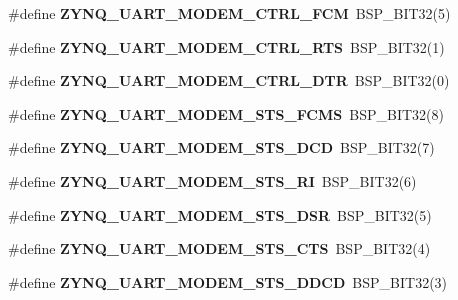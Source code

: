 \begin{DoxyCompactItemize}
\#define {\bfseries Z\+Y\+N\+Q\+\_\+\+U\+A\+R\+T\+\_\+\+M\+O\+D\+E\+M\+\_\+\+C\+T\+R\+L\+\_\+\+F\+CM}~B\+S\+P\+\_\+\+B\+I\+T32(5)
\item 
\mbox{\label{zynq-uart-regs_8h_a3739c725ce8ac1fae373e3b16c62f004}} 
\#define {\bfseries Z\+Y\+N\+Q\+\_\+\+U\+A\+R\+T\+\_\+\+M\+O\+D\+E\+M\+\_\+\+C\+T\+R\+L\+\_\+\+R\+TS}~B\+S\+P\+\_\+\+B\+I\+T32(1)
\item 
\mbox{\label{zynq-uart-regs_8h_a3d44fc5742a763a1e256660f0c39bd17}} 
\#define {\bfseries Z\+Y\+N\+Q\+\_\+\+U\+A\+R\+T\+\_\+\+M\+O\+D\+E\+M\+\_\+\+C\+T\+R\+L\+\_\+\+D\+TR}~B\+S\+P\+\_\+\+B\+I\+T32(0)
\item 
\mbox{\label{zynq-uart-regs_8h_adcb2af6811fa5bd6df6b416c3b75c764}} 
\#define {\bfseries Z\+Y\+N\+Q\+\_\+\+U\+A\+R\+T\+\_\+\+M\+O\+D\+E\+M\+\_\+\+S\+T\+S\+\_\+\+F\+C\+MS}~B\+S\+P\+\_\+\+B\+I\+T32(8)
\item 
\mbox{\label{zynq-uart-regs_8h_ae4118db4540c3f88a9ae59878feaa93d}} 
\#define {\bfseries Z\+Y\+N\+Q\+\_\+\+U\+A\+R\+T\+\_\+\+M\+O\+D\+E\+M\+\_\+\+S\+T\+S\+\_\+\+D\+CD}~B\+S\+P\+\_\+\+B\+I\+T32(7)
\item 
\mbox{\label{zynq-uart-regs_8h_a4bd9fbf5e446e37bfacde9e8bd03c9b4}} 
\#define {\bfseries Z\+Y\+N\+Q\+\_\+\+U\+A\+R\+T\+\_\+\+M\+O\+D\+E\+M\+\_\+\+S\+T\+S\+\_\+\+RI}~B\+S\+P\+\_\+\+B\+I\+T32(6)
\item 
\mbox{\label{zynq-uart-regs_8h_a93809159df1527fc3012aef2c2389ee2}} 
\#define {\bfseries Z\+Y\+N\+Q\+\_\+\+U\+A\+R\+T\+\_\+\+M\+O\+D\+E\+M\+\_\+\+S\+T\+S\+\_\+\+D\+SR}~B\+S\+P\+\_\+\+B\+I\+T32(5)
\item 
\mbox{\label{zynq-uart-regs_8h_ac8b5d5de4574b5cf4533780afda26f45}} 
\#define {\bfseries Z\+Y\+N\+Q\+\_\+\+U\+A\+R\+T\+\_\+\+M\+O\+D\+E\+M\+\_\+\+S\+T\+S\+\_\+\+C\+TS}~B\+S\+P\+\_\+\+B\+I\+T32(4)
\item 
\mbox{\label{zynq-uart-regs_8h_aa02d7c97508e5172612960d7f7b1970a}} 
\#define {\bfseries Z\+Y\+N\+Q\+\_\+\+U\+A\+R\+T\+\_\+\+M\+O\+D\+E\+M\+\_\+\+S\+T\+S\+\_\+\+D\+D\+CD}~B\+S\+P\+\_\+\+B\+I\+T32(3)
\item 

\end{DoxyCompactItemize}
